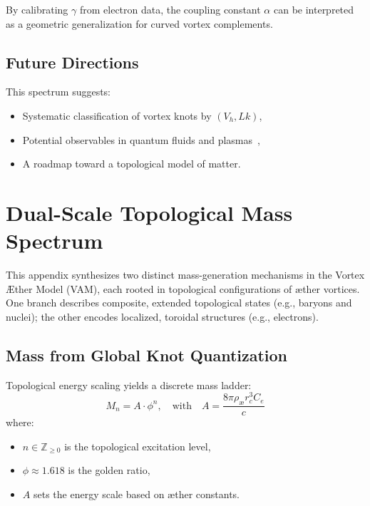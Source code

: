        By calibrating $\gamma$ from electron data, the coupling constant $\alpha$ can be interpreted as a geometric generalization for curved vortex complements.

        \subsection{Future Directions}

        This spectrum suggests:
        \begin{itemize}
            \item Systematic classification of vortex knots by $(V_h, Lk)$,
            \item Potential observables in quantum fluids and plasmas~\cite{arnold1998topological},
            \item A roadmap toward a topological model of matter.
        \end{itemize}



\section{Dual-Scale Topological Mass Spectrum}
        This appendix synthesizes two distinct mass-generation mechanisms in the Vortex Æther Model (VAM), each rooted in topological configurations of æther vortices. One branch describes composite, extended topological states (e.g., baryons and nuclei); the other encodes localized, toroidal structures (e.g., electrons).

        \subsection{Mass from Global Knot Quantization}

        Topological energy scaling yields a discrete mass ladder:
        \begin{equation}
        M_n = A \cdot \phi^n, \quad \text{with} \quad
        A = \frac{8\pi \rho_{\text{æ}} r_c^3 C_e}{c}
        \end{equation}
        where:
        \begin{itemize}
          \item $n \in \mathbb{Z}_{\geq 0}$ is the topological excitation level,
          \item $\phi \approx 1.618$ is the golden ratio,
          \item $A$ sets the energy scale based on æther constants.
        \end{itemize}

